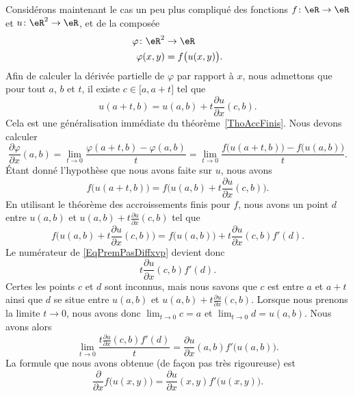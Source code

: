 Considérons maintenant le cas un peu plus compliqué des fonctions \( f\colon \eR\to \eR\) et \( u\colon \eR^2\to \eR\), et de la composée
\begin{equation}
	\begin{aligned}
		\varphi\colon \eR^2 & \to \eR                \\
		\varphi(x,y)        & = f\big( u(x,y) \big).
	\end{aligned}
\end{equation}
Afin de calculer la dérivée partielle de \( \varphi\) par rapport à \( x\), nous admettons que pour tout \( a\), \( b\) et \( t\), il existe \( c\in\mathopen[ a , a+t \mathclose]\) tel que
\begin{equation}
	u(a+t,b)=u(a,b)+t\frac{ \partial u }{ \partial x }(c,b).
\end{equation}
Cela est une généralisation immédiate du théorème~\ref{ThoAccFinis}. Nous devons calculer
\begin{equation}		\label{EqPremPasDiffxvp}
	\frac{ \partial \varphi }{ \partial x }(a,b)=\lim_{t\to 0} \frac{ \varphi(a+t,b)-\varphi(a,b) }{ t }=\lim_{t\to 0} \frac{ f\big( u(a+t,b) \big)-f\big( u(a,b) \big) }{ t }.
\end{equation}
Étant donné l'hypothèse que nous avons faite sur \( u\), nous avons
\begin{equation}
	f\big( u(a+t,b) \big)=f\big( u(a,b)+t\frac{ \partial u }{ \partial x }(c,b) \big).
\end{equation}
En utilisant le théorème des accroissements finis pour \( f\), nous avons un point \( d\) entre \( u(a,b)\) et \( u(a,b)+t\frac{ \partial u }{ \partial x }(c,b)\) tel que
\begin{equation}
	f\big( u(a,b)+t\frac{ \partial u }{ \partial x }(c,b) \big)=f\big( u(a,b) \big)+t\frac{ \partial u }{ \partial x }(c,b)f'(d).
\end{equation}
Le numérateur de \eqref{EqPremPasDiffxvp} devient donc
\begin{equation}
	t\frac{ \partial u }{ \partial x }(c,b)f'(d).
\end{equation}
Certes les points \( c\) et \( d\) sont inconnus, mais nous savons que \( c\) est entre \( a\) et \( a+t\) ainsi que \( d\) se situe entre \( u(a,b)\) et \( u(a,b)+t\frac{ \partial u }{ \partial x }(c,b)\). Lorsque nous prenons la limite \( t\to 0\), nous avons donc \( \lim_{t\to 0} c=a\) et \( \lim_{t\to 0} d=u(a,b)\). Nous avons alors
\begin{equation}
	\lim_{t\to 0} \frac{ t\frac{ \partial u }{ \partial x }(c,b)f'(d) }{ t }=\frac{ \partial u }{ \partial x }(a,b)f'\big( u(a,b) \big).
\end{equation}
La formule que nous avons obtenue (de façon pas très rigoureuse) est
\begin{equation}
	\frac{ \partial  }{ \partial x }f\big( u(x,y) \big)=\frac{ \partial u }{ \partial x }(x,y)f'\big( u(x,y) \big).
\end{equation}

